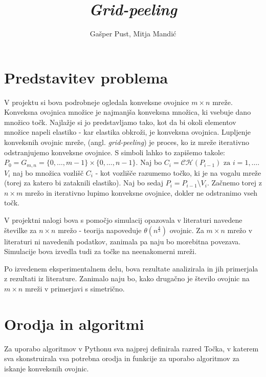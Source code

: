 \documentclass[a4paper]{article}
\title{\textit{Grid-peeling}}
\author{Gašper Pust, Mitja Mandić}
\begin{document}
\begin{titlepage}
 \maketitle
\end{titlepage}

\section{Predstavitev problema}
V projektu si bova podrobneje ogledala konveksne ovojnice $m \times n$ mreže. Konveksna ovojnica množice je najmanjša konveksna množica, ki vsebuje dano množico točk.
Najlažje si jo predstavljamo tako, kot da bi okoli elementov množice napeli elastiko - kar elastika obkroži, je konveksna ovojnica. Lupljenje konveksnih ovojnic mreže,
(angl. \textit{grid-peeling}) je proces, ko iz mreže iterativno odstranjujemo konveksne ovojnice. S simboli lahko to zapišemo takole:
$ P_{0} = G_{m,n} = \{0,\ldots, m-1\} \times \{0, \ldots, n-1\}$. Naj bo $C_{i} = \mathcal{C}\mathcal{H}(P_{i-1}) \text{ za } i = 1, \ldots$. $V_{i}$ naj bo množica vozlišč $C_{i}$
- kot vozlišče razumemo točko, ki je na vogalu mreže (torej za katero bi zataknili elastiko). Naj bo sedaj $P_{i} = P_{i-1} \setminus V_{i}$. Začnemo torej z $n \times m$ mrežo 
in iterativno lupimo konveksne ovojnice, dokler ne odstranimo vseh točk.

V projektni nalogi bova s pomočjo simulacij opazovala v literaturi navedene številke za $n \times n$ mrežo - teorija napoveduje $\theta(n ^ \frac{4}{3})$ ovojnic.
Za $m \times n$ mrežo v literaturi ni navedenih podatkov, zanimala pa naju bo morebitna povezava. Simulacije bova izvedla tudi za točke na neenakomerni mreži.

Po izvedenem eksperimentalnem delu, bova rezultate analizirala in jih primerjala z rezultati iz literature. Zanimalo naju bo, kako drugačno je število ovojnic na $m \times n$
mreži v primerjavi s simetrično.

\newpage
\section{Orodja in algoritmi}
Za uporabo algoritmov v Pythonu sva najprej definirala razred Točka, v katerem sva skonstruirala vsa potrebna orodja in funkcije za uporabo algoritmov za iskanje konveksnih ovojnic.
\end{document}
